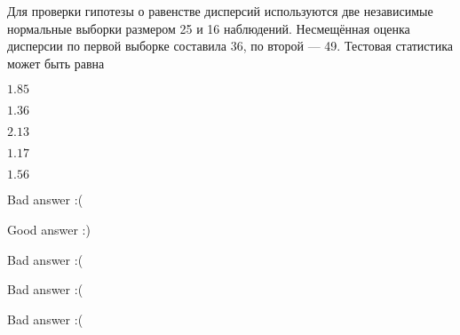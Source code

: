 
\begin{question}
Для проверки гипотезы о равенстве дисперсий используются две независимые
нормальные выборки размером 25 и 16 наблюдений. Несмещённая оценка
дисперсии по первой выборке составила 36, по второй — 49. Тестовая
статистика может быть равна
\begin{answerlist}
  \item \(1.85\)
  \item \(1.36\)
  \item \(2.13\)
  \item \(1.17\)
  \item \(1.56\)
\end{answerlist}
\end{question}

\begin{solution}
\begin{answerlist}
  \item Bad answer :(
  \item Good answer :)
  \item Bad answer :(
  \item Bad answer :(
  \item Bad answer :(
\end{answerlist}
\end{solution}

